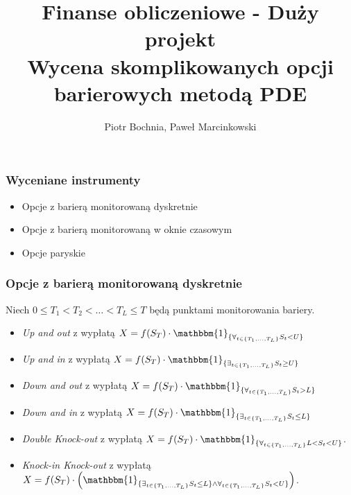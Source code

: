 \documentclass{beamer}
\author{Piotr Bochnia, Paweł Marcinkowski}
\title{Finanse obliczeniowe - Duży projekt \\ Wycena skomplikowanych opcji barierowych metodą PDE}
\begin{document}
\begin{frame}
  \titlepage
\end{frame}
\begin{frame}
  \frametitle{Wyceniane instrumenty}

  \begin{itemize}
  \item Opcje z barierą monitorowaną dyskretnie
  \item Opcje z barierą monitorowaną w oknie czasowym
  \item Opcje paryskie
  \end{itemize}
\end{frame}

\begin{frame}
\frametitle{Opcje z barierą monitorowaną dyskretnie}
Niech $0 \leq T_1 < T_2 < \ldots < T_L \leq T$ będą punktami monitorowania bariery. 
\begin{itemize}

\item \emph{Up and out} z wypłatą $X = f(S_T) \cdot \mathbbm{1}_{\{\forall_{ t \in \{T_1, \ldots, T_L\} } S_t < U \}}$
\item \emph{Up and in} z wypłatą $X = f(S_T) \cdot \mathbbm{1}_{\{\exists_{ t \in \{T_1, \ldots, T_L\} } S_t \geq U \}}$
\item \emph{Down and out} z wypłatą $X = f(S_T) \cdot \mathbbm{1}_{\{\forall_{ t \in \{T_1, \ldots, T_L\} } S_t > L \}}$
\item \emph{Down and in} z wypłatą $X = f(S_T) \cdot \mathbbm{1}_{\{\exists_{ t \in \{T_1, \ldots, T_L\} } S_t \leq L \}}$
\item \emph{Double Knock-out} z wypłatą $X = f(S_T) \cdot \mathbbm{1}_{\{\forall_{ t \in \{T_1, \ldots, T_L\} } L < S_t  < U \}}$.
\item \emph{Knock-in Knock-out} z wypłatą $X = f(S_T) \cdot \left( \mathbbm{1}_{\{\exists_{ t \in \{T_1, \ldots, T_L\} } S_t \leq L \} \wedge \forall_{ t \in \{T_1, \ldots, T_L\} } S_t < U \}}\right)$.  

\end{itemize}


\end{frame}
\end{document}

